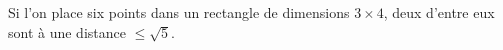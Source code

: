 Si l'on place six points dans un rectangle de dimensions $3 \times 4$, deux d'entre eux sont à une distance $\leq \sqrt{5}$.
